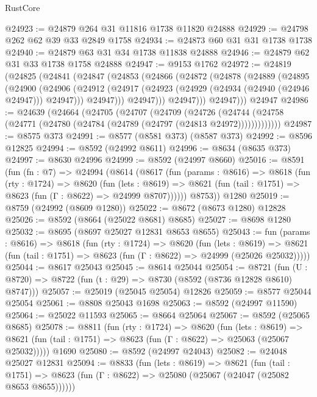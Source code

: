 \begin{lexlean}{RustCore}
\begin{coremodule}
@24923 := @24879 @264 @31 @11816 @1738 @11820 @24888
@24929 := @24798 @262 @62 @39 @33 @2849 @1758
@24934 := @24873 @60 @31 @31 @1738 @1738
@24940 := @24879 @63 @31 @34 @1738 @11838 @24888
@24946 := @24879 @62 @31 @33 @1738 @1758 @24888
@24947 := @9153 @1762
@24972 := @24819
    (@24825
      (@24841
        (@24847
          (@24853
            (@24866
              (@24872
                (@24878
                  (@24889
                    (@24895
                      (@24900
                        (@24906
                          (@24912
                            (@24917 (@24923 (@24929 (@24934 (@24940 (@24946 @24947))) @24947)))
                            @24947)))
                      @24947)))
                @24947)))
          @24947)))
    @24947
@24986 := @24639
    (@24664
      (@24705
        (@24707
          (@24709
            (@24726
              (@24744 (@24758 (@24771 (@24780 (@24784 (@24789 (@24797 (@24813 @24972)))))))))))))
@24987 := @8575 @373
@24991 := @8577 (@8581 @373) (@8587 @373)
@24992 := @8596 @12825
@24994 := @8592 (@24992 @8611)
@24996 := @8634 (@8635 @373)
@24997 := @8630 @24996
@24999 := @8592 (@24997 @8660)
@25016 := @8591
    (fun (fn : @7) =>
    @24994
      (@8614
        (@8617
          (fun (params : @8616) =>
          @8618
            (fun (rty : @1724) =>
            @8620
              (fun (lets : @8619) =>
              @8621 (fun (tail : @1751) => @8623 (fun (Γ : @8622) => @24999 @8707))))))
        @8753))
    @1280
@25019 := @8759 (@24992 (@8609 @1280))
@25022 := @8672 (@8673 @1280) @12828
@25026 := @8592 (@8664 (@25022 @8681) @8685)
@25027 := @8698 @1280
@25032 := @8695 (@8697 @25027 @12831 @8653 @8655)
@25043 := fun (params : @8616) =>
  @8618
    (fun (rty : @1724) =>
    @8620
      (fun (lets : @8619) =>
      @8621 (fun (tail : @1751) => @8623 (fun (Γ : @8622) => @24999 (@25026 @25032)))))
@25044 := @8617 @25043
@25045 := @8614 @25044
@25054 := @8721
    (fun (U : @8720) => @8722 (fun (t : @29) => @8730 (@8592 (@8736 @12828 @8610) @8747)))
@25057 := @25019 (@25045 @25054) @12826
@25059 := @8577 @25044 @25054
@25061 := @8808 @25043 @1698
@25063 := @8592 (@24997 @11590)
@25064 := @25022 @11593
@25065 := @8664 @25064
@25067 := @8592 (@25065 @8685)
@25078 := @8811
    (fun (rty : @1724) =>
    @8620
      (fun (lets : @8619) =>
      @8621 (fun (tail : @1751) => @8623 (fun (Γ : @8622) => @25063 (@25067 @25032)))))
    @1690
@25080 := @8592 (@24997 @24043)
@25082 := @24048 @25027 @12831
@25094 := @8833
    (fun (lets : @8619) =>
    @8621
      (fun (tail : @1751) =>
      @8623 (fun (Γ : @8622) => @25080 (@25067 (@24047 (@25082 @8653 @8655))))))

\end{coremodule}
\end{lexlean}
